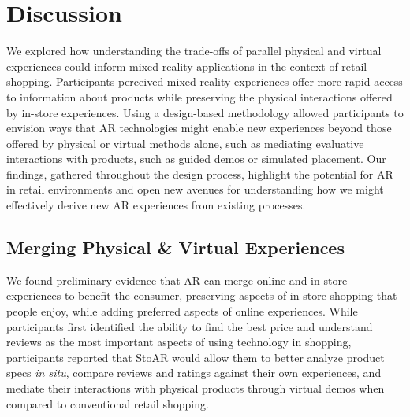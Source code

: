 \section{Discussion}
We explored how understanding the trade-offs of parallel physical and virtual experiences could inform mixed reality applications in the context of retail shopping. Participants perceived mixed reality experiences offer more rapid access to information about products while preserving the physical interactions offered by in-store experiences. Using a design-based methodology allowed participants to envision ways that AR technologies might enable new experiences beyond those offered by physical or virtual methods alone, such as mediating evaluative interactions with products, such as guided demos or simulated placement.  
Our findings, gathered throughout the design process, highlight the potential for AR in retail environments and open new avenues for understanding how we might effectively derive new AR experiences from existing processes. 

\subsection{Merging Physical \& Virtual Experiences}
We found preliminary evidence that AR can merge online and in-store experiences to benefit the consumer, preserving aspects of in-store shopping that people enjoy, while adding preferred aspects of online experiences.  While participants first identified the ability to find the best price and understand reviews as the most important aspects of using technology in shopping, participants reported that StoAR would allow them to better analyze product specs \emph{in situ}, compare reviews and ratings against their own experiences, and mediate their interactions with physical products through virtual demos when compared to conventional retail shopping. 

